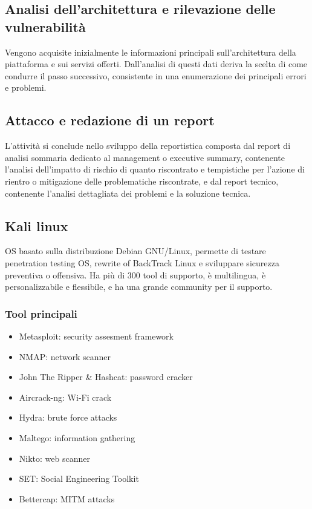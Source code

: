 \documentclass[8pt]{extarticle}
\begin{document}
\subsection{Analisi dell’architettura e rilevazione delle vulnerabilità}
Vengono acquisite inizialmente le informazioni principali sull'architettura della piattaforma e sui servizi 
offerti. Dall'analisi di questi dati deriva la scelta di come condurre il passo successivo, consistente in 
una enumerazione dei principali errori e problemi. 
\subsection{Attacco e redazione di un report}
L'attività si conclude nello sviluppo della reportistica composta dal report di analisi sommaria dedicato 
al management o executive summary, contenente l'analisi dell'impatto di rischio di quanto riscontrato e 
tempistiche per l'azione di rientro o mitigazione delle problematiche riscontrate, e dal report tecnico, 
contenente l'analisi dettagliata dei problemi e la soluzione tecnica. 
\subsection{Kali linux}
OS basato sulla distribuzione Debian GNU/Linux, permette di testare penetration testing OS, rewrite of 
BackTrack Linux e sviluppare sicurezza preventiva o offensiva. Ha più di 300 tool di supporto, è 
multilingua, è personalizzabile e flessibile, e ha una grande community per il supporto.
\subsubsection{Tool principali} 
\begin{itemize}
    \item Metasploit: security assesment framework
    \item NMAP: network scanner 
    \item John The Ripper \& Hashcat: password cracker
    \item Aircrack-ng: Wi-Fi crack
    \item Hydra: brute force attacks
    \item Maltego: information gathering
    \item Nikto: web scanner
    \item SET: Social Engineering Toolkit
    \item Bettercap: MITM attacks 
\end{itemize}
\end{document}
